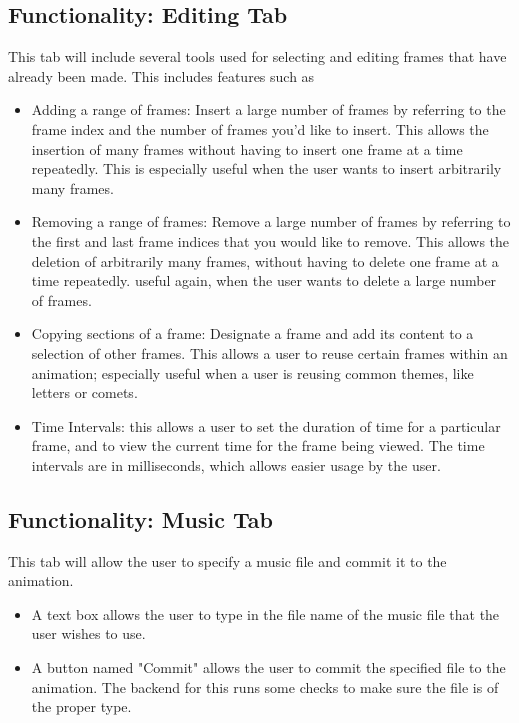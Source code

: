 \documentclass[12pt]{extarticle}
\begin{document}
	\subsection{Functionality: Editing Tab}
	This tab will include several tools used for selecting and editing frames that have already been made. This includes features such as
	\begin{itemize}
			\item Adding a range of frames: Insert a large number of frames by referring to the frame index and the number of frames you'd like to insert.  This allows the insertion of many frames without having to insert one frame at a time repeatedly.  This is especially useful when the user wants to insert arbitrarily many frames.
			\item Removing a range of frames: Remove a large number of frames by referring to the first and last frame indices that you would like to remove.  This allows the deletion of arbitrarily many frames, without having to delete one frame at a time repeatedly.  useful again, when the user wants to delete a large number of frames.
			\item Copying sections of a frame: Designate a frame and add its content to a selection of other frames.  This allows a user to reuse certain frames within an animation; especially useful when a user is reusing common themes, like letters or comets.
			\item Time Intervals: this allows a user to set the duration of time for a particular frame, and to view the current time for the frame being viewed.  The time intervals are in milliseconds, which allows easier usage by the user.
	\end{itemize}

	\subsection{Functionality: Music Tab }
	This tab will allow the user to specify a music file and commit it to the animation.
	\begin{itemize}
		\item A text box allows the user to type in the file name of the music file that the user wishes to use.  
		\item A button named "Commit" allows the user to commit the specified file to the animation.  The backend for this runs some checks to make sure the file is of the proper type.
	\end{itemize}
\end{document}
